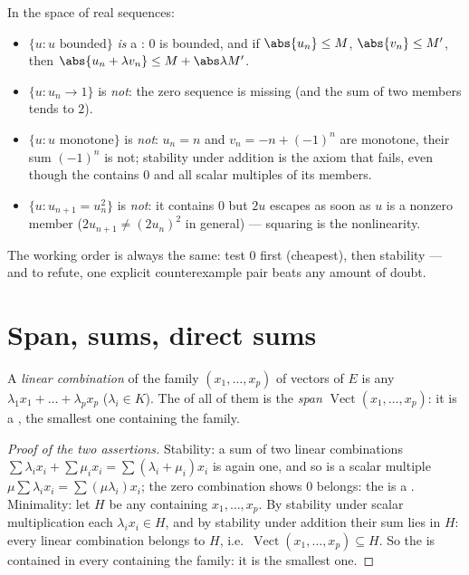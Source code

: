 \begin{example}
\label{ex:b1:vspaces:subspaceornot}
In the space of real sequences:
\begin{itemize}
  \item $\{u : u \text{ bounded}\}$ \emph{is} a : $0$ is
        bounded, and if $\abs{u_n} \leq M$, $\abs{v_n} \leq M'$,
        then $\abs{u_n + \lambda v_n} \leq M + \abs\lambda M'$.
  \item $\{u : u_n \to 1\}$ is \emph{not}: the zero sequence is
        missing (and the sum of two members tends to $2$).
  \item $\{u : u \text{ monotone}\}$ is \emph{not}: $u_n = n$
        and $v_n = -n + (-1)^n$ are monotone, their sum
        $(-1)^n$ is not; stability under addition is the axiom
        that fails, even though the  contains $0$ and all
        scalar multiples of its members.
  \item $\{u : u_{n+1} = u_n^2\}$ is \emph{not}: it contains $0$
        but $2u$ escapes as soon as $u$ is a nonzero member
        ($2u_{n+1} \neq (2u_n)^2$ in general) --- squaring is
        the nonlinearity.
\end{itemize}
The working order is always the same: test $0$ first (cheapest),
then stability --- and to refute, one explicit counterexample
pair beats any amount of doubt.
\end{example}

\section{Span, sums, direct sums}

\begin{definition}\label{def:b1:vspaces:span}
A \emph{linear combination} of the family $(x_1, \dots, x_p)$ of
vectors of $E$ is any $\lambda_1 x_1 + \dots + \lambda_p x_p$
($\lambda_i \in K$). The  of all of them is the
\emph{span} $\operatorname{Vect}(x_1, \dots, x_p)$: it
is a , the smallest one containing the family.
\end{definition}

\begin{proof}[Proof of the two assertions]
Stability: a sum of two linear combinations $\sum\lambda_i x_i +
\sum\mu_i x_i = \sum(\lambda_i + \mu_i)x_i$ is again one, and so
is a scalar multiple $\mu\sum\lambda_i x_i = \sum(\mu\lambda_i)
x_i$; the zero combination shows $0$ belongs: the  is a
. Minimality: let $H$ be any  containing $x_1,
\dots, x_p$. By stability under scalar multiplication each
$\lambda_i x_i \in H$, and by stability under addition their sum
lies in $H$: every linear combination belongs to $H$, i.e.\
$\operatorname{Vect}(x_1, \dots, x_p) \subseteq H$. So the 
is contained in every \omterm{def:b1:vspaces:subspace}{subspace} containing the family: it is the
smallest one.
\end{proof}

